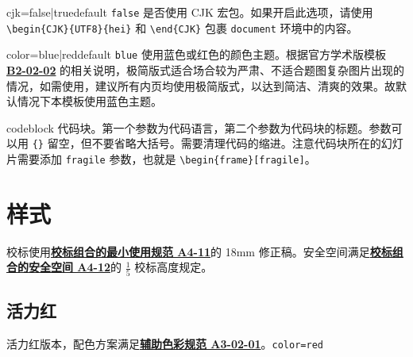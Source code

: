 \documentclass[a4paper,12pt]{article}
\begin{document}
\begin{CJK}{UTF8}{song}
\begin{docKey*}[SJTUBeamer]{cjk}{=false|true}{default \texttt{false}}
    是否使用 \textsf{CJK} 宏包。如果开启此选项，请使用 \verb"\begin{CJK}{UTF8}{hei}" 和 \verb"\end{CJK}" 包裹 \verb"document" 环境中的内容。
\end{docKey*}

\begin{docKey*}[SJTUBeamer]{color}{=blue|red}{default \texttt{blue}}
    使用蓝色或红色的颜色主题。根据官方学术版模板 \href{http://vi.sjtu.edu.cn/index.php/articles/app/8}{\textbf{B2-02-02}} 的相关说明，极简版式适合场合较为严肃、不适合题图复杂图片出现的情况，如需使用，建议所有内页均使用极简版式，以达到简洁、清爽的效果。故默认情况下本模板使用蓝色主题。
\end{docKey*}

\begin{docEnvironment*}[doc parameter=\marg{language}\marg{title}, doclang/environment content=code]{codeblock}{}
    代码块。第一个参数为代码语言，第二个参数为代码块的标题。参数可以用 \verb"{}" 留空，但不要省略大括号。需要清理代码的缩进。注意代码块所在的幻灯片需要添加 \verb"fragile" 参数，也就是 \verb"\begin{frame}[fragile]"。
\end{docEnvironment*}

\newpage
\section{样式}

校标使用\href{http://vi.sjtu.edu.cn/index.php/articles/base/4}{\textbf{校标组合的最小使用规范 A4-11}}的 18mm
 修正稿。安全空间满足\href{http://vi.sjtu.edu.cn/index.php/articles/base/4}{\textbf{校标组合的安全空间 A4-12}}的 $\frac{1}{5}$ 校标高度规定。

\subsection{活力红}

活力红版本，配色方案满足\href{http://vi.sjtu.edu.cn/index.php/articles/base/3}{\textbf{辅助色彩规范 A3-02-01}}。\hfill\texttt{color=red}

\begin{tcbraster}[raster columns=2,colframe=red,colback=white,
    colbacktitle=red!50!white,fonttitle=\small\bfseries\ttfamily,
    left=0pt,right=0pt,top=0pt,bottom=0pt,boxsep=0pt,boxrule=0.6pt,
    toptitle=1mm,bottomtitle=1mm,drop lifted shadow,center title,
    graphics pages={1,...,6}]
\end{tcbraster}


\end{CJK}
\end{document}
